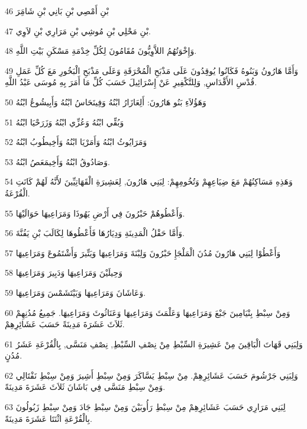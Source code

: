 \par 46 بْنِ أَمْصِي بْنِ بَانِي بْنِ شَامَِرَ
\par 47 بْنِ مَحْلِي بْنِ مُوشِي بْنِ مَرَارِي بْنِ لاَوِي.
\par 48 وَإِخْوَتُهُمُ اللاَّوِيُّونَ مُقَامُونَ لِكُلِّ خِدْمَةِ مَسْكَنِ بَيْتِ اللَّهِ.
\par 49 وَأَمَّا هَارُونُ وَبَنُوهُ فَكَانُوا يُوقِدُونَ عَلَى مَذْبَحِ الْمُحْرَقَةِ وَعَلَى مَذْبَحِ الْبَخُورِ مَعَ كُلِّ عَمَلِ قُدْسِ الأَقْدَاسِ, وَلِلتَّكْفِيرِ عَنْ إِسْرَائِيلَ حَسَبَ كُلِّ مَا أَمَرَ بِهِ مُوسَى عَبْدُ اللَّهِ.
\par 50 وَهَؤُلاَءِ بَنُو هَارُونَ: أَلِعَازَارُ ابْنُهُ وَفِينَحَاسُ ابْنُهُ وَأَبِيشُوعُ ابْنُهُ
\par 51 وَبُقِّي ابْنُهُ وَعُزِّي ابْنُهُ وَزَرَحْيَا ابْنُهُ
\par 52 وَمَرَايُوثُ ابْنُهُ وَأَمَرْيَا ابْنُهُ وَأَخِيطُوبُ ابْنُهُ
\par 53 وَصَادُوقُ ابْنُهُ وَأَخِيمَعَصُ ابْنُهُ.
\par 54 وَهَذِهِ مَسَاكِنُهُمْ مَعَ ضِيَاعِهِمْ وَتُخُومِهِمْ: لِبَنِي هَارُونَ, لِعَشِيرَةِ الْقَهَاتِيِّينَ لأَنَّهُ لَهُمْ كَانَتِ الْقُرْعَةُ.
\par 55 وَأَعْطُوهُمْ حَبْرُونَ فِي أَرْضِ يَهُوذَا وَمَرَاعِيهَا حَوَالَيْهَا.
\par 56 وَأَمَّا حَقْلُ الْمَدِينَةِ وَدِيَارُهَا فَأَعْطُوهَا لِكَالَبَ بْنِ يَفُنَّةَ.
\par 57 وَأَعْطُوْا لِبَنِي هَارُونَ مُدُنَ الْمَلْجَإِ حَبْرُونَ وَلِبْنَةَ وَمَرَاعِيهَا وَيَتِّيرَ وَأَشْتَمُوعَ وَمَرَاعِيهَا
\par 58 وَحِيلَيْنَ وَمَرَاعِيهَا وَدَبِيرَ وَمَرَاعِيهَا
\par 59 وَعَاشَانَ وَمَرَاعِيهَا وَبَيْتَشَمْسَ وَمَرَاعِيهَا.
\par 60 وَمِنْ سِبْطِ بِنْيَامِينَ جَبْعَ وَمَرَاعِيهَا وَعَلْمَثَ وَمَرَاعِيهَا وَعَنَاثُوثَ وَمَرَاعِيهَا. جَمِيعُ مُدُنِهِمْ ثَلاَثَ عَشَرَةَ مَدِينَةً حَسَبَ عَشَائِرِهِمْ.
\par 61 وَلِبَنِي قَهَاتَ الْبَاقِينَ مِنْ عَشِيرَةِ السِّبْطِ مِنْ نِصْفِ السِّبْطِ, نِصْفِ مَنَسَّى, بِالْقُرْعَةِ عَشَرُ مُدُنٍ.
\par 62 وَلِبَنِي جَرْشُومَ حَسَبَ عَشَائِرِهِمْ. مِنْ سِبْطِ يَسَّاكَرَ وَمِنْ سِبْطِ أَشِيرَ وَمِنْ سِبْطِ نَفْتَالِي وَمِنْ سِبْطِ مَنَسَّى فِي بَاشَانَ ثَلاَثَ عَشَرَةَ مَدِينَةً.
\par 63 لِبَنِي مَرَارِي حَسَبَ عَشَائِرِهِمْ مِنْ سِبْطِ رَأُوبَيْنَ وَمِنْ سِبْطِ جَادَ وَمِنْ سِبْطِ زَبُولُونَ بِالْقُرْعَةِ اثْنَتَا عَشَرَةَ مَدِينَةً.
